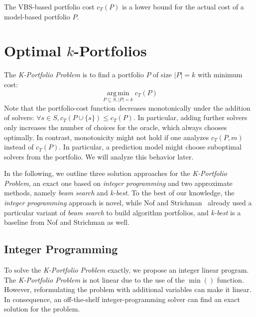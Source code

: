 \documentclass[a4paper,USenglish,pdfa]{lipics-v2021} %
\DeclareMathOperator*{\argmin}{arg\,min}
\begin{document}
The VBS-based portfolio cost $c_{T}(P)$ is a lower bound for the actual cost of a model-based portfolio $P$.

\section{Optimal \texorpdfstring{$k$}{k}-Portfolios} %
\label{sec:approach}

The \emph{K-Portfolio Problem} is to find a portfolio $P$ of size $|P| = k$ with minimum cost:%
\[
\argmin\limits_{P \subseteq S, |P| = k} c_{T}(P)
\]
Note that the portfolio-cost function decreases monotonically under the addition of solvers: $\forall s \in S, c_{T}(P \cup \{s\}) \leq c_{T}(P)$. 
In particular, adding further solvers only increases the number of choices for the oracle, which always chooses optimally.
In contrast, monotonicity might not hold if one analyzes $c_{T}(P,m)$ instead of $c_{T}(P)$.
In particular, a prediction model might choose suboptimal solvers from the portfolio.
We will analyze this behavior later.

In the following, we outline three solution approaches for the \emph{K-Portfolio Problem}, an exact one based on \emph{integer programming} and two approximate methods, namely \emph{beam search} and \emph{k-best}. 
To the best of our knowledge, the \emph{integer programming} approach is novel,
while Nof and Strichman~\cite{nof2020real} already used a particular variant of \emph{beam search} to build algorithm portfolios,
and \emph{k-best} is a baseline from Nof and Strichman as well.

\subsection{Integer Programming}
\label{sec:approach:ip}

To solve the \emph{K-Portfolio Problem} exactly, we propose an integer linear program.
The \emph{K-Portfolio Problem} is not linear due to the use of the $\min()$ function.
However, reformulating the problem with additional variables can make it linear.
In consequence, an off-the-shelf integer-programming solver can find an exact solution for the problem.
\end{document}
